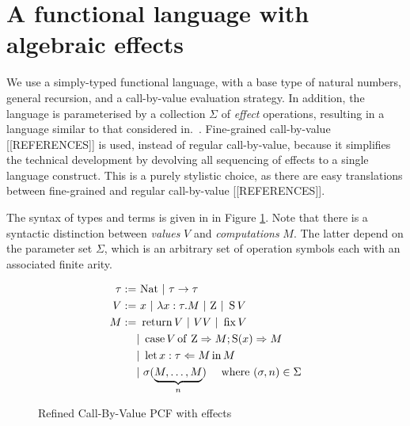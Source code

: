 \section{A functional language with algebraic effects}

We use a  simply-typed  functional language, with a base type of natural numbers, general recursion, and a call-by-value evaluation strategy. In addition, 
the language is 
parameterised by a collection $\Sigma$ of \emph{effect} operations, resulting in a 
language similar to that considered in.~\cite{plotkin2001adequacy}.
Fine-grained call-by-value [[REFERENCES]]  is used, instead of regular call-by-value,
because it simplifies the technical development by devolving all sequencing of effects to a single
language construct. 
This is a purely stylistic choice, as there are easy translations between fine-grained and regular call-by-value
[[REFERENCES]].

The syntax of types and terms is given in in Figure \ref{fig:language}. 
Note that there is a syntactic distinction between \emph{values} $V$ and \emph{computations} $M$.
The latter depend on the 
parameter set $\Sigma$, which  is 
an arbitrary set of operation symbols each with an associated finite arity.



\begin{figure}[h!]
    \begin{align*}
        \tau :=& ~\Nat ~|~ \tau \to \tau \\
        V :=& ~x ~|~ \lambda x:\tau. M ~|~ \Zero ~|~ \Succ V \\
        M :=& ~\Ret V ~|~ V V ~|~ \Fix V \\
                    &|~ \lcase{V}{M}{M} \\
                    &|~ \Bind{M}{x:\tau}{M} \\
                    &|~ \sigma(\underbrace{M, \dots, M}_n ) \quad \text{ where } (\sigma,n)  \in \Sigma
    \end{align*}
    \caption{Refined Call-By-Value PCF with effects}
    \label{fig:language}
\end{figure}
%
%

